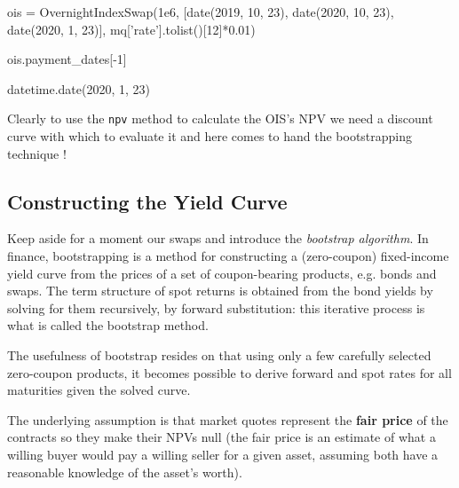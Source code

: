 \begin{ipython}
ois = OvernightIndexSwap(1e6,
                         [date(2019, 10, 23), date(2020, 10, 23),
                          date(2020, 1, 23)],
                         mq['rate'].tolist()[12]*0.01)

ois.payment_dates[-1]
\end{ipython}
\begin{ioutput}
datetime.date(2020, 1, 23)
\end{ioutput}

Clearly to use the \texttt{npv} method to calculate the OIS's NPV we need a discount curve with which to evaluate it and here comes to hand the bootstrapping technique !

\subsection{Constructing the Yield Curve}\label{the-bootstrapping-technique}

Keep aside for a moment our swaps and introduce the \emph{bootstrap
algorithm}. In finance, bootstrapping is a method for constructing a
(zero-coupon) fixed-income yield curve from the prices of a set of
coupon-bearing products, e.g. bonds and swaps. The term structure of
spot returns is obtained from the bond yields by solving for them
recursively, by forward substitution: this iterative process is what is called the bootstrap method. 

The usefulness of bootstrap resides on that using only a few carefully selected zero-coupon products, it becomes possible to derive forward and spot rates for all maturities given the solved curve.

The underlying assumption is that market quotes represent the \textbf{fair price} of the contracts so they make their NPVs null (the fair price is an estimate of what a willing buyer would pay a willing seller for a given asset, assuming both have a reasonable knowledge of the asset's worth).

